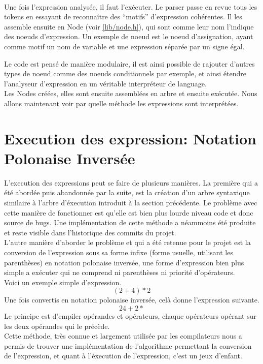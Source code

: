         \newpage

        \paragraph{}
            Une fois l'expression analysée, il faut l'exécuter. Le parser passe en revue tous les tokens en essayant de reconnaître des ``motifs'' d'expression cohérentes. Il les assemble ensuite en Node (voir \ref{lib/node.h}), qui sont comme leur nom l'indique des noeuds d'expression. Un exemple de noeud est le noeud d'assignation, ayant comme motif un nom de variable et une expression séparée par un signe égal.


            Le code est pensé de manière modulaire, il est ainsi possible de rajouter d'autres types de noeud comme des noeuds conditionnels par exemple, et ainsi étendre l'analyseur d'expression en un véritable interpréteur de language.
            \\ Les Nodes créées, elles sont ensuite assemblées en arbre et ensuite exécutée. Nous allons maintenant voir par quelle méthode les  expressions sont interprétées.

    \section{Execution des expression: Notation Polonaise Inversée}
        L'execution des expressions peut se faire de plusieurs manières. La première qui a été abordée puis abandonnée par la suite, est la création d'un arbre syntaxique similaire à l'arbre d'éxecution introduit à la section précédente. Le problème avec cette manière de fonctionner est qu'elle est bien plus lourde niveau code et donc source de bugs. Une implémentation de cette méthode a néammoins été produite et reste visible dans l'historique des commits du projet.
        \\ L'autre manière d'aborder le problème et qui a été retenue pour le projet est la conversion de l'expression sous sa forme infixe (forme usuelle, utilisant les parenthèses) en notation polonaise inversée, une forme d'expression bien plus simple a exécuter qui ne comprend ni parenthèses ni priorité d'opérateurs.
        \\ Voici un exemple simple d'expression.
        \begin{equation}
            (2 + 4) * 2
        \end{equation}
        Une fois convertis en notation polonaise inversée, celà donne l'expression suivante.
        \begin{equation}
            2 4 + 2 *
        \end{equation}
        Le principe est d'empiler opérandes et opérateurs, chaque opérateurs opérant sur les deux opérandes qui le précède.
        \\ Cette méthode, très connue et largement utilisée par les compilateurs nous a permis de trouver une implémentation de l'algorithme permettant la conversion de l'expression, et quant à l'éxecution de l'expression, c'est un jeux d'enfant.